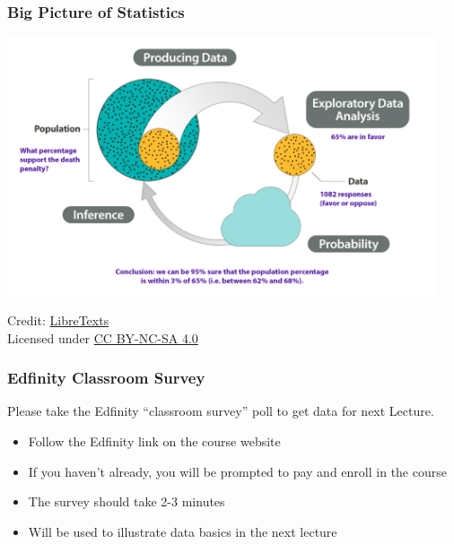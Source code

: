 \documentclass[slidestop,compress,mathserif]{beamer}
\begin{document}
\begin{frame}
    \frametitle{Big Picture of Statistics}
    \begin{center}
        \includegraphics[width=0.95\textwidth]{figures/BigPicture2.png}
    \end{center}
    \vspace{0.5em}
    \footnotesize
    Credit: \href{https://stats.libretexts.org/Bookshelves/Applied_Statistics/Biostatistics_-_Open_Learning_Textbook/Preliminaries/The_Big_Picture}{LibreTexts}
    \\
    Licensed under \href{https://creativecommons.org/licenses/by-nc-sa/4.0/}{CC BY-NC-SA 4.0}
\end{frame}



\begin{frame}
	\frametitle{Edfinity Classroom Survey} 

	Please take the Edfinity ``classroom survey'' poll to get data for next Lecture.

	\begin{itemize}
		\item Follow the Edfinity link on the course website
		\item If you haven't already, you will be prompted to pay and enroll in the course
		\item The survey should take 2-3 minutes
		\item Will be used to illustrate data basics in the next lecture
	\end{itemize}
\end{frame}





\end{document}
